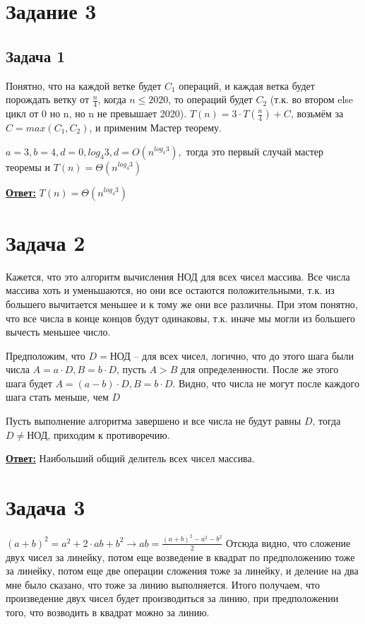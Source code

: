 \documentclass[a4paper,14pt]{article} %
\begin{document}

\section{Задание 3}

\subsection{Задача 1}
Понятно, что на каждой ветке будет $C_1$ операций, и каждая ветка будет порождать ветку от $\frac{n}{4}$, когда $n \leq 2020$, то операций будет $C_2$ (т.к. во втором else цикл от 0 но n, но n не превышает 2020).
$T(n) = 3 \cdot T(\frac{n}{4}) + C$, возьмём за $C = max(C_1, C_2)$, и применим Мастер теорему.

$a = 3, b = 4, d = 0, log_4 3, d = O(n^{log_4 3}),$ тогда это первый случай мастер теоремы и $T(n) = \Theta(n^{log_4 3})$

\underline{\textbf{Ответ:}} $T(n) = \Theta(n^{log_4 3})$

\section{Задача 2}
Кажется, что это алгоритм вычисления НОД для всех чисел массива.
Все числа массива хоть и уменьшаются, но они все остаются положительными, т.к. из большего вычитается меньшее и к тому  же они все различны.
При этом понятно, что все числа в конце концов будут одинаковы, т.к. иначе мы могли из большего вычесть меньшее число. 

Предположим, что $D = \text{НОД}$ -- для всех чисел, логично, что до этого шага были числа $A = a \cdot D, B = b \cdot D$, пусть $A > B$ для определенности.
После же этого шага будет $A = (a - b) \cdot D, B = b \cdot D$. Видно, что числа не могут после каждого шага стать меньше, чем $D$

Пусть выполнение алгоритма завершено и все числа не будут равны $D$, тогда $D \not = \text{НОД}$, приходим к противоречию.

\underline{\textbf{Ответ:}} Наибольший общий делитель всех чисел массива.

\section{Задача 3}
$(a+b)^2 = a^2 + 2\cdot ab + b^2 \longrightarrow ab = \frac{(a+b)^2 - a^2 - b^2}{2}$
\newline
Отсюда видно, что сложение двух чисел за линейку, потом еще возведение в квадрат по предположению тоже за линейку, потом еще две операции сложения тоже за линейку, и деление на два мне было сказано, что тоже за линию выполняется.
Итого получаем, что произведение двух чисел будет производиться за линию, при предположении того, что возводить в квадрат можно за линию.
\end{document}
